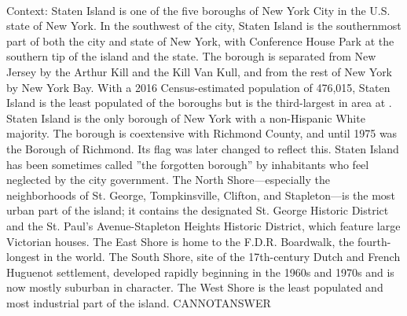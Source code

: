 \documentclass[11pt,a4paper, onecolumn]{article}
\begin{document}
\\ Context: Staten Island is one of the five boroughs of New York City in the U.S. state of New York. In the southwest of the city, Staten Island is the southernmost part of both the city and state of New York, with Conference House Park at the southern tip of the island and the state. The borough is separated from New Jersey by the Arthur Kill and the Kill Van Kull, and from the rest of New York by New York Bay. With a 2016 Census-estimated population of 476,015, Staten Island is the least populated of the boroughs but is the third-largest in area at . Staten Island is the only borough of New York with a non-Hispanic White majority. The borough is coextensive with Richmond County, and until 1975 was the Borough of Richmond. Its flag was later changed to reflect this. Staten Island has been sometimes called ''the forgotten borough'' by inhabitants who feel neglected by the city government. The North Shore—especially the neighborhoods of St. George, Tompkinsville, Clifton, and Stapleton—is the most urban part of the island; it contains the designated St. George Historic District and the St. Paul's Avenue-Stapleton Heights Historic District, which feature large Victorian houses. The East Shore is home to the F.D.R. Boardwalk, the fourth-longest in the world. The South Shore, site of the 17th-century Dutch and French Huguenot settlement, developed rapidly beginning in the 1960s and 1970s and is now mostly suburban in character. The West Shore is the least populated and most industrial part of the island. CANNOTANSWER
\end{document}
